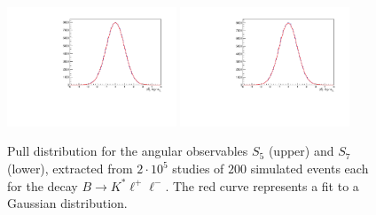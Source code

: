 \documentclass[aps,nofootinbib,preprintnumbers,prd,twocolumn]{revtex4-1}
\begin{document}
\begin{figure}[b]
        \centering
            \includegraphics[width=0.45\textwidth]{figs/Q2_5_6_S5_200.pdf}
            \includegraphics[width=0.45\textwidth]{figs/Q2_5_6_S7_200.pdf}
        \caption{Pull distribution for the angular observables $S_5$ (upper) and $S_7$ (lower), extracted from $2\cdot 10^5$ studies of
        $200$ simulated events each for the decay $B\to K^*\ell^+\ell^-$. The red curve represents a fit to a Gaussian distribution.}
        \label{fig:pulls}
\end{figure}
\end{document}
